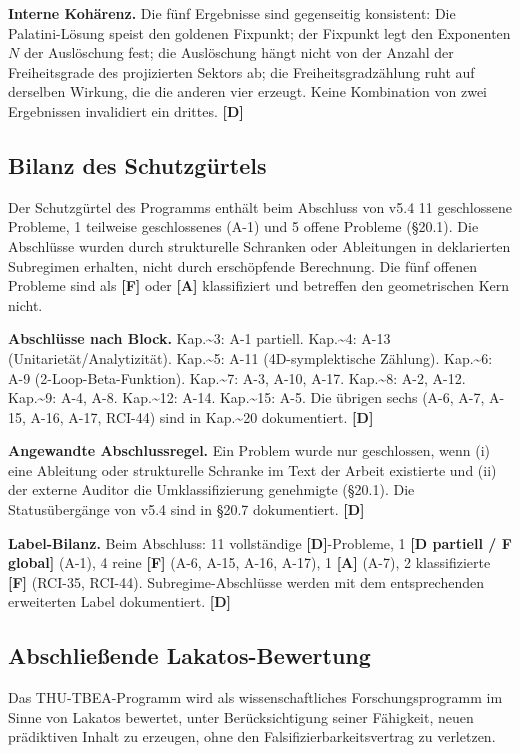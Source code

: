 ﻿\documentclass[11pt,letterpaper]{article}
\begin{document}
\textbf{Interne Kohärenz.} Die fünf Ergebnisse sind gegenseitig konsistent: Die Palatini-Lösung speist den goldenen Fixpunkt; der Fixpunkt legt den Exponenten $N$ der Auslöschung fest; die Auslöschung hängt nicht von der Anzahl der Freiheitsgrade des projizierten Sektors ab; die Freiheitsgradzählung ruht auf derselben Wirkung, die die anderen vier erzeugt. Keine Kombination von zwei Ergebnissen invalidiert ein drittes. \textbf{[D]}
\subsection{Bilanz des Schutzgürtels}
Der Schutzgürtel des Programms enthält beim Abschluss von v5.4 11 geschlossene Probleme, 1 teilweise geschlossenes (A-1) und 5 offene Probleme (§20.1). Die Abschlüsse wurden durch strukturelle Schranken oder Ableitungen in deklarierten Subregimen erhalten, nicht durch erschöpfende Berechnung. Die fünf offenen Probleme sind als \textbf{[F]} oder \textbf{[A]} klassifiziert und betreffen den geometrischen Kern nicht.

\textbf{Abschlüsse nach Block.} Kap.\textasciitilde{}3: A-1 partiell. Kap.\textasciitilde{}4: A-13 (Unitarietät/Analytizität). Kap.\textasciitilde{}5: A-11 (4D-symplektische Zählung). Kap.\textasciitilde{}6: A-9 (2-Loop-Beta-Funktion). Kap.\textasciitilde{}7: A-3, A-10, A-17. Kap.\textasciitilde{}8: A-2, A-12. Kap.\textasciitilde{}9: A-4, A-8. Kap.\textasciitilde{}12: A-14. Kap.\textasciitilde{}15: A-5. Die übrigen sechs (A-6, A-7, A-15, A-16, A-17, RCI-44) sind in Kap.\textasciitilde{}20 dokumentiert. \textbf{[D]}

\textbf{Angewandte Abschlussregel.} Ein Problem wurde nur geschlossen, wenn (i) eine Ableitung oder strukturelle Schranke im Text der Arbeit existierte und (ii) der externe Auditor die Umklassifizierung genehmigte (§20.1). Die Statusübergänge von v5.4 sind in §20.7 dokumentiert. \textbf{[D]}

\textbf{Label-Bilanz.} Beim Abschluss: 11 vollständige \textbf{[D]}-Probleme, 1 \textbf{[D partiell / F global]} (A-1), 4 reine \textbf{[F]} (A-6, A-15, A-16, A-17), 1 \textbf{[A]} (A-7), 2 klassifizierte \textbf{[F]} (RCI-35, RCI-44). Subregime-Abschlüsse werden mit dem entsprechenden erweiterten Label dokumentiert. \textbf{[D]}
\subsection{Abschließende Lakatos-Bewertung}
Das THU-TBEA-Programm wird als wissenschaftliches Forschungsprogramm im Sinne von Lakatos bewertet, unter Berücksichtigung seiner Fähigkeit, neuen prädiktiven Inhalt zu erzeugen, ohne den Falsifizierbarkeitsvertrag zu verletzen.
\end{document}
